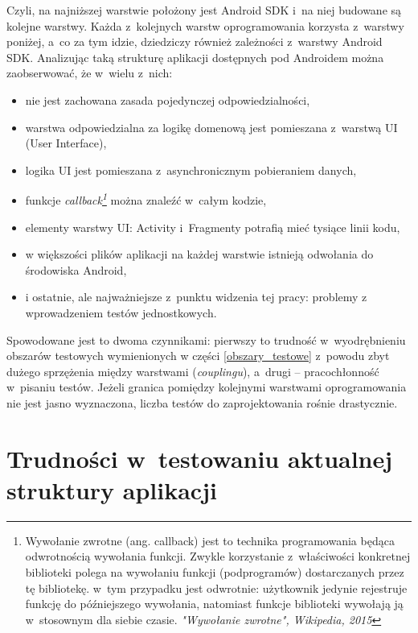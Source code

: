 Czyli, na najniższej warstwie położony jest Android SDK i~na niej budowane są kolejne warstwy. Każda z~kolejnych warstw oprogramowania korzysta z~warstwy poniżej, a~co za tym idzie, dziedziczy również zależności z~warstwy Android SDK. Analizując taką strukturę aplikacji dostępnych pod Androidem można zaobserwować, że w~wielu z~nich:
\begin{itemize}
\item
nie jest zachowana zasada pojedynczej odpowiedzialności,
\item
warstwa odpowiedzialna za logikę domenową jest pomieszana z~warstwą UI (User Interface),
\item
logika UI jest pomieszana z~asynchronicznym pobieraniem danych,
\item
funkcje \textit{callback\footnote{Wywołanie zwrotne (ang. callback) jest to technika programowania będąca odwrotnością wywołania funkcji. Zwykle korzystanie z~właściwości konkretnej biblioteki polega na wywołaniu funkcji (podprogramów) dostarczanych przez tę bibliotekę. w~tym przypadku jest odwrotnie: użytkownik jedynie rejestruje funkcję do późniejszego wywołania, natomiast funkcje biblioteki wywołają ją w~stosownym dla siebie czasie. \textit{"Wywołanie zwrotne", Wikipedia, 2015}}} można znaleźć w~całym kodzie,
\item
elementy warstwy UI: Activity i~Fragmenty potrafią mieć tysiące linii kodu,
\item
w większości plików aplikacji na każdej warstwie istnieją odwołania do środowiska Android,
\item
i ostatnie, ale najważniejsze z~punktu widzenia tej pracy: problemy z wprowadzeniem testów jednostkowych.
\end{itemize}

Spowodowane jest to dwoma czynnikami: pierwszy to trudność w~wyodrębnieniu obszarów testowych wymienionych w części \ref{obszary_testowe} z~powodu zbyt dużego sprzężenia między warstwami (\textit{couplingu}), a~drugi – pracochłonność w~pisaniu testów. Jeżeli granica pomiędzy kolejnymi warstwami oprogramowania nie jest jasno wyznaczona, liczba testów do zaprojektowania rośnie drastycznie.

\section{Trudności w~testowaniu aktualnej struktury \newline aplikacji}
\label{testowanie_starej_struktury}

